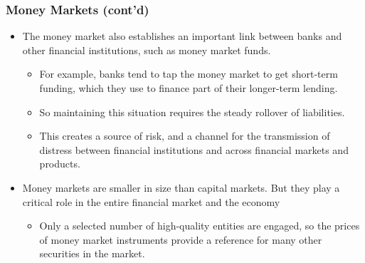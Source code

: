 \documentclass[10pt]{beamer}
\begin{document}
	
	\begin{frame}
		\frametitle{Money Markets (cont'd)}
		
		\begin{itemize}  \vspace{5pt} \itemsep10pt
			\item The money market also establishes an important link between banks and other financial institutions, such as money market funds. 
			
			\begin{itemize}  \vspace{5pt} \itemsep10pt
				\item For example, banks tend to tap the money market to get short-term funding, which they use to finance part of their longer-term lending. 
				\item So maintaining this situation requires the steady rollover of liabilities. 
				\item This creates a source of risk, and a channel for the transmission of distress between financial institutions and across financial markets and products.
			\end{itemize}
			
			\item Money markets are smaller in size than capital markets. But they play a critical role in the entire financial market and the economy
			\begin{itemize}  \vspace{5pt} \itemsep10pt
				\item Only a selected number of high-quality entities are engaged, so the prices of money market instruments provide a reference for many other securities in the market.
			\end{itemize} 
			
			
		\end{itemize}
		
	\end{frame}
	
	
	
\end{document}

